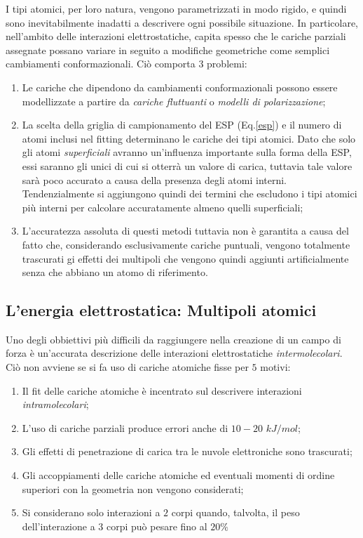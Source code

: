 \documentclass[oneside]{amsbook}
\numberwithin{section}{chapter}
\numberwithin{equation}{section}
\numberwithin{figure}{section}
\begin{document}
I tipi atomici, per loro natura, vengono parametrizzati in modo rigido, e quindi sono inevitabilmente inadatti a descrivere ogni possibile situazione. In particolare, nell'ambito delle interazioni elettrostatiche, capita spesso che le cariche parziali assegnate possano variare in seguito a modifiche geometriche come semplici cambiamenti conformazionali. Ciò comporta $3$ problemi:
\begin{enumerate}
\item Le cariche che dipendono da cambiamenti conformazionali possono essere modellizzate a partire da \emph{cariche fluttuanti} o \emph{modelli di polarizzazione};
\item La scelta della griglia di campionamento del ESP (Eq.\ref{esp}) e il numero di atomi inclusi nel fitting determinano le cariche dei tipi atomici. Dato che solo gli atomi 	\emph{superficiali} avranno un'influenza importante sulla forma della ESP, essi saranno gli unici di cui si otterrà un valore di carica, tuttavia tale valore sarà poco accurato a causa della presenza degli atomi interni. Tendenzialmente si aggiungono quindi dei termini che escludono i tipi atomici più interni per calcolare accuratamente almeno quelli superficiali;
\item L'accuratezza assoluta di questi metodi tuttavia non è garantita a causa del fatto che, considerando esclusivamente cariche puntuali, vengono totalmente trascurati gi effetti dei multipoli che vengono quindi aggiunti artificialmente senza che abbiano un atomo di riferimento. 
\end{enumerate}
\subsection{L'energia elettrostatica: Multipoli atomici}\label{ee2}

Uno degli obbiettivi più difficili da raggiungere nella creazione di un campo di forza è un'accurata descrizione delle interazioni elettrostatiche \emph{intermolecolari}. Ciò non avviene se si fa uso di cariche atomiche fisse per $ 5$ motivi:
\begin{enumerate}
\item Il fit delle cariche atomiche è incentrato sul descrivere interazioni \emph{intramolecolari};
\item L'uso di cariche parziali produce errori anche di $10-20$ $kJ/mol$;
\item Gli effetti di penetrazione di carica tra le nuvole elettroniche sono trascurati;
\item Gli accoppiamenti delle cariche atomiche ed eventuali momenti di ordine superiori con la geometria non vengono considerati;
\item Si considerano solo interazioni a $2$ corpi quando, talvolta, il peso dell'interazione a $3$ corpi può pesare fino al $20\%$
\end{enumerate}
\end{document}
